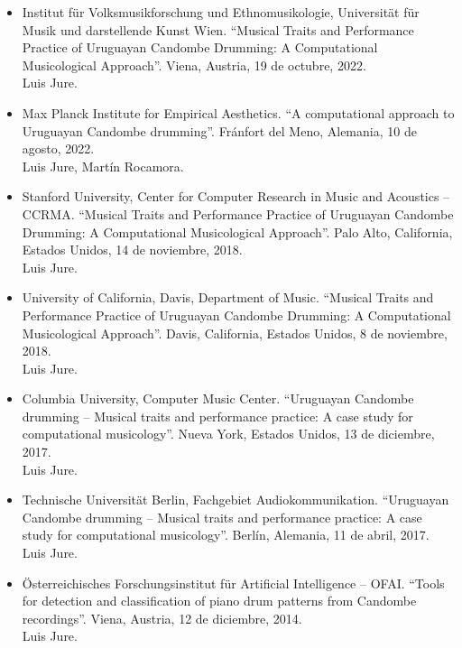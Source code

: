 \documentclass[a4paper]{article}
\begin{document}
\begin{itemize}

\item[ ]	%
Institut für Volksmusikforschung und Ethnomusikologie, Universität für Musik und darstellende Kunst Wien.
``Musical Traits and Performance Practice of Uruguayan Candombe Drumming:
A Computational Musicological Approach''.
Viena, Austria, 19 de octubre, 2022.\\
Luis Jure.

\item[ ]	%
Max Planck Institute for Empirical Aesthetics.
``A computational approach to Uruguayan Candombe drumming''.
Fránfort del Meno, Alemania, 10 de agosto, 2022.\\
Luis Jure, Martín Rocamora.

\item[ ]	%
Stanford University, Center for Computer Research in Music and Acoustics -- CCRMA.
``Musical Traits and Performance Practice of Uruguayan Candombe Drumming:
A Computational Musicological Approach''.
Palo Alto, California, Estados Unidos, 14 de noviembre, 2018.\\
Luis Jure.

\item[ ]	%
University of California, Davis, Department of Music.
``Musical Traits and Performance Practice of Uruguayan Candombe Drumming:
A Computational Musicological Approach''.
Davis, California, Estados Unidos, 8 de noviembre, 2018.\\
Luis Jure.

\item[ ]	%
Columbia University, Computer Music Center.
``Uruguayan Candombe drumming -- Musical traits and performance practice:
A case study for computational musicology''.
Nueva York, Estados Unidos, 13 de diciembre, 2017.\\
Luis Jure.

\item[ ]	%
Technische Universität Berlin, Fachgebiet Audiokommunikation.
``Uruguayan Candombe drumming -- Musical traits and performance practice:
A case study for computational musicology''.
Berlín, Alemania, 11 de abril, 2017.\\
Luis Jure.

\item[ ]	%
Österreichisches Forschungsinstitut für Artificial Intelligence -- OFAI.
``Tools for detection and classification of piano drum patterns from Candombe recordings''.
Viena, Austria, 12 de diciembre, 2014.\\
Luis Jure.


\end{itemize}
\end{document}
